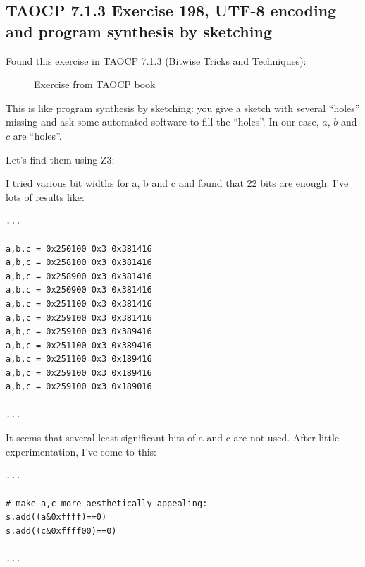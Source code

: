 \subsection{TAOCP 7.1.3 Exercise 198, UTF-8 encoding and program synthesis by sketching}

Found this exercise in TAOCP 7.1.3 (Bitwise Tricks and Techniques):

\begin{figure}[H]
\centering
{}
\caption{Exercise from TAOCP book}
\end{figure}

This is like program synthesis by sketching: you give a sketch with several ``holes'' missing and ask some
automated software to fill the ``holes''.
In our case, $a$, $b$ and $c$ are ``holes''.

Let's find them using Z3:



I tried various bit widths for a, b and c and found that 22 bits are enough.
I've lots of results like:

\begin{lstlisting}
...

a,b,c = 0x250100 0x3 0x381416
a,b,c = 0x258100 0x3 0x381416
a,b,c = 0x258900 0x3 0x381416
a,b,c = 0x250900 0x3 0x381416
a,b,c = 0x251100 0x3 0x381416
a,b,c = 0x259100 0x3 0x381416
a,b,c = 0x259100 0x3 0x389416
a,b,c = 0x251100 0x3 0x389416
a,b,c = 0x251100 0x3 0x189416
a,b,c = 0x259100 0x3 0x189416
a,b,c = 0x259100 0x3 0x189016

...
\end{lstlisting}

It seems that several least significant bits of a and c are not used.
After little experimentation, I've come to this:

\begin{lstlisting}
...

# make a,c more aesthetically appealing:
s.add((a&0xffff)==0)
s.add((c&0xffff00)==0)

...
\end{lstlisting}

